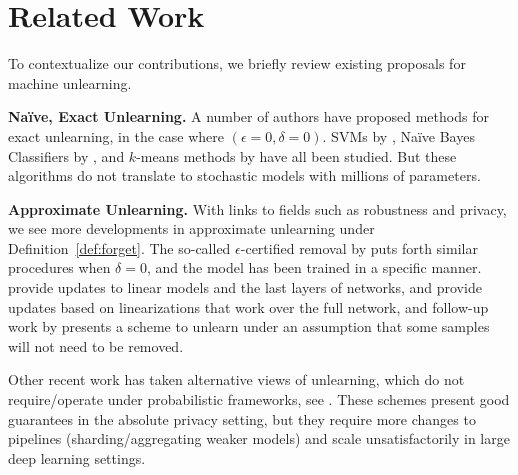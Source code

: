 \section{Related Work}
To contextualize our contributions, 
we briefly review existing proposals for machine unlearning. 

\noindent\textbf{Na\"ive, Exact Unlearning.}
A number of authors have proposed methods for exact unlearning, in the case where $(\epsilon=0, \delta=0)$. SVMs by \cite{romero2007incremental,karasuyama2009multiple}, Na\"ive Bayes Classifiers by \cite{cao2015towards}, and $k$-means methods by \cite{ginart2019making} have all been studied. 
But these algorithms do not translate to stochastic models with millions of parameters.

\noindent\textbf{Approximate Unlearning.} 
With links to fields such as robustness and privacy, we see more developments in approximate unlearning under Definition~\ref{def:forget}. 
The so-called $\epsilon$-certified removal by \cite{guo2019certified} puts forth similar procedures when $\delta=0$, and the model has been trained in a specific manner.
\cite{guo2019certified,izzo2020approximate} provide updates to linear models and the last layers of networks, and 
\cite{golatkar2020forgetting,golatkar2020eternal} provide updates based on linearizations that work over the full network, and follow-up work by \cite{Golatkar_2021_CVPR} presents a scheme to unlearn under an assumption that some samples will not need to be removed.

Other recent work has taken alternative views of unlearning, which do not require/operate under probabilistic frameworks, see \cite{bourtoule2021machine,neel2021descent}. These schemes present good guarantees in the absolute privacy setting, but they require more changes to  pipelines (sharding/aggregating weaker models) and scale unsatisfactorily in large deep learning settings.